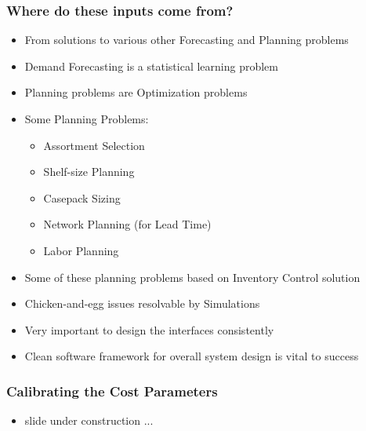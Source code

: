 \documentclass[handout]{beamer}
\begin{document}
\begin{frame}
\frametitle{Where do these inputs come from?}
\pause
\begin{itemize}[<+->]
\item From solutions to various other Forecasting and Planning problems
\item Demand Forecasting is a statistical learning problem
\item Planning problems are Optimization problems
\item Some Planning Problems:
\begin{itemize}
\item Assortment Selection
\item Shelf-size Planning
\item Casepack Sizing
\item Network Planning (for Lead Time)
\item Labor Planning
\end{itemize}
\item Some of these planning problems based on Inventory Control solution
\item Chicken-and-egg issues resolvable by Simulations
\item Very important to design the interfaces consistently
\item Clean software framework for overall system design is vital to success
\end{itemize}
\end{frame}

\begin{frame}
\frametitle{Calibrating the Cost Parameters}
\begin{itemize}
\item slide under construction ...
\end{itemize}
\end{frame}
\end{document}
